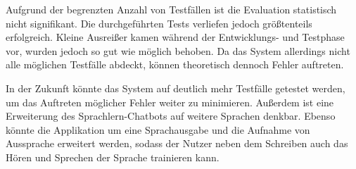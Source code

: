 Aufgrund der begrenzten Anzahl von Testfällen ist die Evaluation statistisch nicht signifikant. Die durchgeführten Tests verliefen jedoch größtenteils erfolgreich.
Kleine Ausreißer kamen während der Entwicklungs- und Testphase vor, wurden jedoch so gut wie möglich behoben.
Da das System allerdings nicht alle möglichen Testfälle abdeckt, können theoretisch dennoch Fehler auftreten.

In der Zukunft könnte das System auf deutlich mehr Testfälle getestet werden, um das Auftreten möglicher Fehler weiter zu minimieren.
Außerdem ist eine Erweiterung des Sprachlern-Chatbots auf weitere Sprachen denkbar. Ebenso könnte die Applikation um eine Sprachausgabe und 
die Aufnahme von Aussprache erweitert werden, sodass der Nutzer neben dem Schreiben auch das Hören und Sprechen der Sprache trainieren kann.